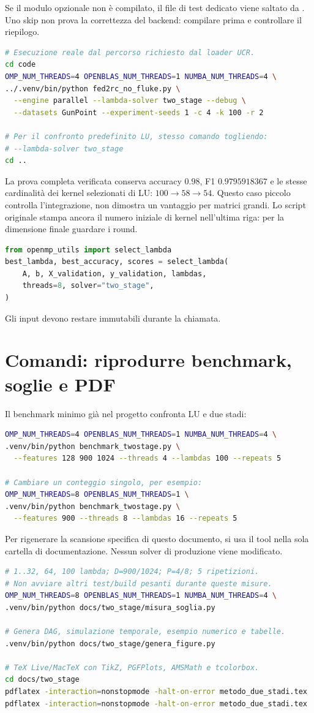 \documentclass[11pt,a4paper]{article}
\newcommand{\cod}[1]{\texttt{\detokenize{#1}}}
\newcommand{\page}[1]{\clearpage\section{#1}}
\begin{document}
\begin{attenzione}[title=Controllare anche gli skip]
Se il modulo opzionale non è compilato, il file di test dedicato viene
saltato da \cod{pytest.importorskip}. Uno skip non prova la correttezza
del backend: compilare prima e controllare il riepilogo.
\end{attenzione}
\begin{lstlisting}[language=bash]
# Esecuzione reale dal percorso richiesto dal loader UCR.
cd code
OMP_NUM_THREADS=4 OPENBLAS_NUM_THREADS=1 NUMBA_NUM_THREADS=4 \
../.venv/bin/python fed2rc_no_fluke.py \
  --engine parallel --lambda-solver two_stage --debug \
  --datasets GunPoint --experiment-seeds 1 -c 4 -k 100 -r 2

# Per il confronto predefinito LU, stesso comando togliendo:
# --lambda-solver two_stage
cd ..
\end{lstlisting}
La prova completa verificata conserva accuracy $0.98$, F1
$0.9795918367$ e le stesse cardinalità dei kernel selezionati di LU:
$100\to58\to54$. Questo caso piccolo controlla l'integrazione, non dimostra
un vantaggio per matrici grandi. Lo script originale stampa ancora il numero
iniziale di kernel nell'ultima riga: per la dimensione finale guardare i round.
\begin{idea}[title=Esempio Python]
\begin{lstlisting}[language=Python]
from openmp_utils import select_lambda
best_lambda, best_accuracy, scores = select_lambda(
    A, b, X_validation, y_validation, lambdas,
    threads=8, solver="two_stage",
)
\end{lstlisting}
Gli input devono restare immutabili durante la chiamata.
\end{idea}
\page{Comandi: riprodurre benchmark, soglie e PDF}
Il benchmark minimo già nel progetto confronta LU e due stadi:
\begin{lstlisting}[language=bash]
OMP_NUM_THREADS=4 OPENBLAS_NUM_THREADS=1 NUMBA_NUM_THREADS=4 \
.venv/bin/python benchmark_twostage.py \
  --features 128 900 1024 --threads 4 --lambdas 100 --repeats 5

# Cambiare un conteggio singolo, per esempio:
OMP_NUM_THREADS=8 OPENBLAS_NUM_THREADS=1 \
.venv/bin/python benchmark_twostage.py \
  --features 900 --threads 8 --lambdas 16 --repeats 5
\end{lstlisting}
Per rigenerare la scansione specifica di questo documento, si usa il tool
nella sola cartella di documentazione. Nessun solver di produzione viene modificato.
\begin{lstlisting}[language=bash]
# 1..32, 64, 100 lambda; D=900/1024; P=4/8; 5 ripetizioni.
# Non avviare altri test/build pesanti durante queste misure.
OMP_NUM_THREADS=8 OPENBLAS_NUM_THREADS=1 NUMBA_NUM_THREADS=4 \
.venv/bin/python docs/two_stage/misura_soglia.py

# Genera DAG, simulazione temporale, esempio numerico e tabelle.
.venv/bin/python docs/two_stage/genera_figure.py

# TeX Live/MacTeX con TikZ, PGFPlots, AMSMath e tcolorbox.
cd docs/two_stage
pdflatex -interaction=nonstopmode -halt-on-error metodo_due_stadi.tex
pdflatex -interaction=nonstopmode -halt-on-error metodo_due_stadi.tex
\end{lstlisting}
\end{document}
